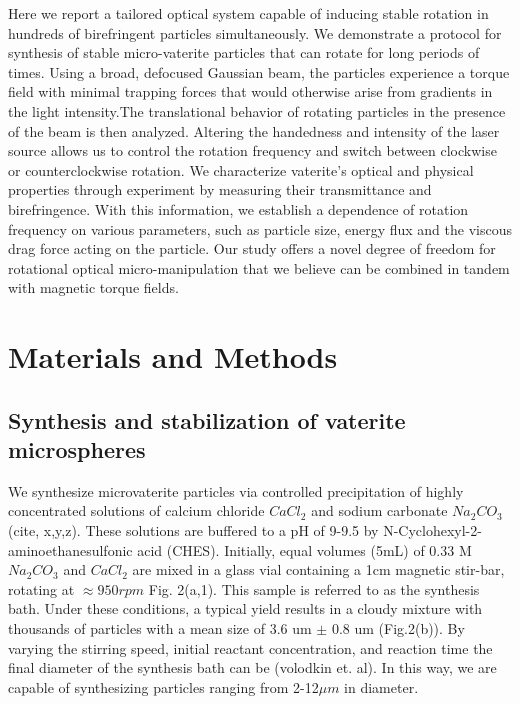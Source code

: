 \documentclass[12pt]{article}
\begin{document}
Here we report a tailored optical system capable of inducing stable rotation in hundreds of birefringent particles simultaneously. We demonstrate a protocol for synthesis of stable micro-vaterite particles that can rotate for long periods of times. Using a broad, defocused Gaussian beam, the particles experience a torque field with minimal trapping forces that would otherwise arise from gradients in the light intensity.The translational behavior of rotating particles in the presence of the beam is then analyzed. Altering the handedness and intensity of the laser source allows us to control the rotation frequency and switch between clockwise or counterclockwise rotation.  We characterize vaterite's optical and physical properties through experiment by measuring their transmittance and birefringence. With this information, we establish a dependence of rotation frequency on various parameters, such as particle size, energy flux and the viscous drag force acting on the particle. Our study offers a novel degree of freedom for rotational optical micro-manipulation that we believe can be combined in tandem with magnetic torque fields.

\section*{Materials and Methods}
\subsection*{Synthesis and stabilization of vaterite microspheres}
We synthesize microvaterite particles via controlled precipitation of highly concentrated solutions of calcium chloride $CaCl_{2}$ and sodium carbonate $Na_{2}CO_{3}$ (cite, x,y,z). These solutions are buffered to a pH of 9-9.5 by N-Cyclohexyl-2-aminoethanesulfonic acid (CHES). Initially, equal volumes (5mL) of 0.33 M $Na_{2}CO_{3}$ and $CaCl_2$ are mixed in a glass vial containing a 1cm magnetic stir-bar, rotating at $\approx 950rpm$ Fig. 2(a,1). This sample is referred to as the synthesis bath. Under these conditions, a typical yield results in a cloudy mixture with  thousands of particles with a mean size of 3.6 um $\pm$ 0.8 um (Fig.2(b)). By varying the stirring speed, initial reactant concentration, and reaction time the final diameter of the synthesis bath can be  (volodkin et. al). In this way, we are capable of synthesizing particles ranging from 2-12$\mu m$ in diameter.
\end{document}
